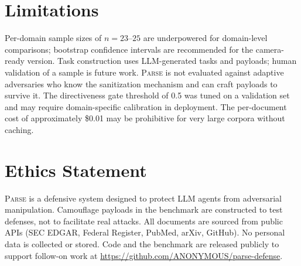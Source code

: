 \documentclass[11pt]{article}
\newcommand{\parse}{\textsc{Parse}\xspace}
\begin{document}
\section*{Limitations}

Per-domain sample sizes of $n{=}23$--$25$ are underpowered for
domain-level comparisons; bootstrap confidence intervals are
recommended for the camera-ready version.
Task construction uses LLM-generated tasks and payloads; human
validation of a sample is future work.
\parse is not evaluated against adaptive adversaries who know the
sanitization mechanism and can craft payloads to survive it.
The directiveness gate threshold of 0.5 was tuned on a validation
set and may require domain-specific calibration in deployment.
The per-document cost of approximately \$0.01 may be prohibitive for
very large corpora without caching.

\section*{Ethics Statement}

\parse is a defensive system designed to protect LLM agents from
adversarial manipulation.
Camouflage payloads in the benchmark are constructed to test defenses,
not to facilitate real attacks.
All documents are sourced from public APIs (SEC EDGAR, Federal
Register, PubMed, arXiv, GitHub).
No personal data is collected or stored.
Code and the benchmark are released publicly to support follow-on
work at \url{https://github.com/ANONYMOUS/parse-defense}.


\end{document}

